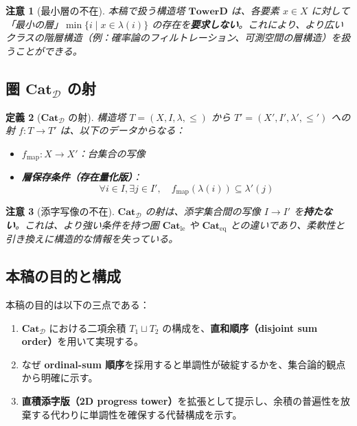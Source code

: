 \documentclass[a4paper,12pt]{ltjsarticle}
\newtheorem{definition}{定義}[section]
\newtheorem{remark}[definition]{注意}
\theoremstyle{definition}
\begin{document}
\begin{remark}[最小層の不在]
本稿で扱う構造塔 $\mathbf{TowerD}$ は、各要素 $x \in X$ に対して「最小の層」$\min\{i \mid x \in \lambda(i)\}$ の存在を\textbf{要求しない}。これにより、より広いクラスの階層構造（例：確率論のフィルトレーション、可測空間の層構造）を扱うことができる。
\end{remark}

\subsection{圏 $\mathbf{Cat}_{\mathcal{D}}$ の射}

\begin{definition}[$\mathbf{Cat}_{\mathcal{D}}$ の射]
構造塔 $T = (X, I, \lambda, \leq)$ から $T' = (X', I', \lambda', \leq')$ への射 $f : T \to T'$ は、以下のデータからなる：
\begin{itemize}
    \item $f_{\mathrm{map}} : X \to X'$：台集合の写像
    \item \textbf{層保存条件（存在量化版）}：
    \[
    \forall i \in I, \exists j \in I', \quad f_{\mathrm{map}}(\lambda(i)) \subseteq \lambda'(j)
    \]
\end{itemize}
\end{definition}

\begin{remark}[添字写像の不在]
$\mathbf{Cat}_{\mathcal{D}}$ の射は、添字集合間の写像 $I \to I'$ を\textbf{持たない}。これは、より強い条件を持つ圏 $\mathbf{Cat}_{\mathrm{le}}$ や $\mathbf{Cat}_{\mathrm{eq}}$ との違いであり、柔軟性と引き換えに構造的な情報を失っている。
\end{remark}

\subsection{本稿の目的と構成}

本稿の目的は以下の三点である：
\begin{enumerate}
    \item $\mathbf{Cat}_{\mathcal{D}}$ における二項余積 $T_1 \sqcup T_2$ の構成を、\textbf{直和順序（disjoint sum order）}を用いて実現する。
    \item なぜ \textbf{ordinal-sum 順序}を採用すると単調性が破綻するかを、集合論的観点から明確に示す。
    \item \textbf{直積添字版（2D progress tower）}を拡張として提示し、余積の普遍性を放棄する代わりに単調性を確保する代替構成を示す。
\end{enumerate}
\end{document}
